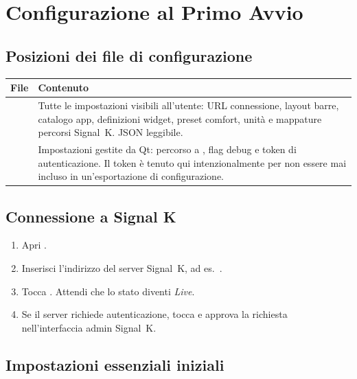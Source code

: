 \section{Configurazione al Primo Avvio}
\label{app:primo-avvio}

\subsection{Posizioni dei file di configurazione}

\begin{longtable}{L{3.6cm}L{10.1cm}}
\toprule
{}
\color{white}\sffamily\bfseries File &
\color{white}\sffamily\bfseries Contenuto \\
\midrule
{}  &
  Tutte le impostazioni visibili all'utente: URL connessione, layout barre, catalogo app,
  definizioni widget, preset comfort, unità e mappature percorsi Signal~K. JSON leggibile. \\
   &
  Impostazioni gestite da Qt: percorso a , flag debug e token
  di autenticazione. Il token è tenuto qui intenzionalmente per non essere mai incluso
  in un'esportazione di configurazione. \\
\bottomrule
\end{longtable}

\subsection{Connessione a Signal K}

\begin{enumerate}
  \item Apri .
  \item Inserisci l'indirizzo del server Signal~K,
        ad es.\ .
  \item Tocca . Attendi che lo stato diventi \textit{Live}.
  \item Se il server richiede autenticazione, tocca  e approva
        la richiesta nell'interfaccia admin Signal~K.
\end{enumerate}

\subsection{Impostazioni essenziali iniziali}

